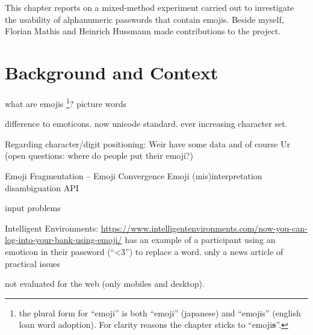 This chapter reports on a mixed-method experiment carried out to investigate the usability of alphanumeric passwords that contain emojis. Beside myself, Florian Mathis and Heinrich Hussmann made contributions to the project. 


\section{Background and Context}
what are emojis \footnote{the plural form for ``emoji'' is both ``emoji'' (japanese) and ``emojis'' (english loan word adoption). For clarity reasons the chapter sticks to ``emoji\textbf{s}''.}?  picture words \cite{Taggart2015NewWords}

difference to emoticons. now unicode standard. ever increasing character set. 

Regarding character/digit positioning: Weir \etal have some data \cite{Weir2010MetricsPolicies} and of course Ur \etal \cite{Ur2015PWCreationLab} (open questions: where do people put their emoji?)


Emoji Fragmentation -- Emoji Convergence 
Emoji (mis)interpretation 
\cite{Tigwell2016EmojiMisunderstandings}
\cite{Miller2015BlissfullyHappyEmoji}
\cite{Wijeratne2010} disambiguation API

\cite{Pohl2017BeyondTextEmoji} input problems

\cite{Golla2017EmojiAuth, Kraus2017Emoji}
Intelligent Environments: \url{https://www.intelligentenvironments.com/now-you-can-log-into-your-bank-using-emoji/}
\cite{Kuo2006HumanSelectionMnemonic} has an example of a participant using an emoticon in their password (``<3'') to replace a word. 
\cite{Dashinsky2015NoEmojisInPWs} only a news article of practical issues
\cite{Malih2015ThesisEmojiPWs}

not evaluated for the web (only mobiles and desktop).


